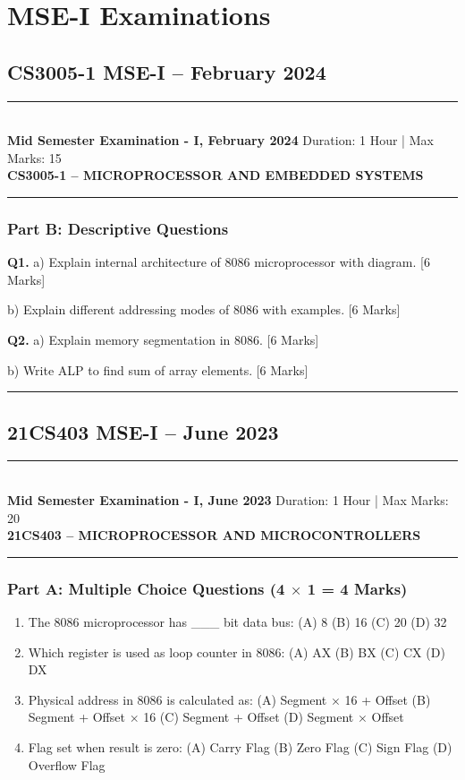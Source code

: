 \documentclass[11pt,a4paper]{article}
\newcommand{\examheader}[4]{
\noindent\rule{\textwidth}{0.5pt}\\
\textbf{#1} \hfill Duration: #3 | Max Marks: #4\\
\textbf{#2}\\
\rule{\textwidth}{0.5pt}
\vspace{0.2cm}
}
\begin{document}
\section{MSE-I Examinations}

\subsection{CS3005-1 MSE-I -- February 2024}
\examheader{Mid Semester Examination - I, February 2024}{CS3005-1 -- MICROPROCESSOR AND EMBEDDED SYSTEMS}{1 Hour}{15}

\subsubsection*{Part B: Descriptive Questions}

\textbf{Q1.} a) Explain internal architecture of 8086 microprocessor with diagram. \hfill [6 Marks]

b) Explain different addressing modes of 8086 with examples. \hfill [6 Marks]

\textbf{Q2.} a) Explain memory segmentation in 8086. \hfill [6 Marks]

b) Write ALP to find sum of array elements. \hfill [6 Marks]

\vspace{0.5cm}
\hrule
\vspace{0.5cm}

\subsection{21CS403 MSE-I -- June 2023}
\examheader{Mid Semester Examination - I, June 2023}{21CS403 -- MICROPROCESSOR AND MICROCONTROLLERS}{1 Hour}{20}

\subsubsection*{Part A: Multiple Choice Questions (4 $\times$ 1 = 4 Marks)}

\begin{enumerate}
\item The 8086 microprocessor has \_\_\_ bit data bus: (A) 8 (B) 16 (C) 20 (D) 32

\item Which register is used as loop counter in 8086: (A) AX (B) BX (C) CX (D) DX

\item Physical address in 8086 is calculated as: (A) Segment $\times$ 16 + Offset (B) Segment + Offset $\times$ 16 (C) Segment + Offset (D) Segment $\times$ Offset

\item Flag set when result is zero: (A) Carry Flag (B) Zero Flag (C) Sign Flag (D) Overflow Flag
\end{enumerate}
\end{document}
